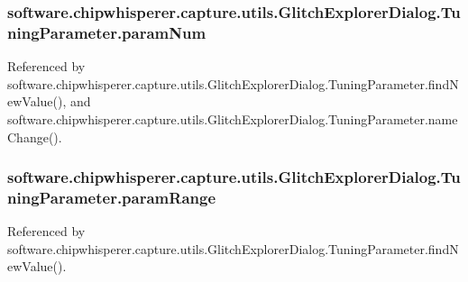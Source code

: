 \subsubsection[{param\+Num}]{\setlength{\rightskip}{0pt plus 5cm}software.\+chipwhisperer.\+capture.\+utils.\+Glitch\+Explorer\+Dialog.\+Tuning\+Parameter.\+param\+Num}\label{classsoftware_1_1chipwhisperer_1_1capture_1_1utils_1_1GlitchExplorerDialog_1_1TuningParameter_a29c3a9b9e51899e60e36e582db1cec06}


Referenced by software.\+chipwhisperer.\+capture.\+utils.\+Glitch\+Explorer\+Dialog.\+Tuning\+Parameter.\+find\+New\+Value(), and software.\+chipwhisperer.\+capture.\+utils.\+Glitch\+Explorer\+Dialog.\+Tuning\+Parameter.\+name\+Change().

\hypertarget{classsoftware_1_1chipwhisperer_1_1capture_1_1utils_1_1GlitchExplorerDialog_1_1TuningParameter_a1b6d2b9d82fe104bcb629514b512ddcf}{}
\subsubsection[{param\+Range}]{\setlength{\rightskip}{0pt plus 5cm}software.\+chipwhisperer.\+capture.\+utils.\+Glitch\+Explorer\+Dialog.\+Tuning\+Parameter.\+param\+Range}\label{classsoftware_1_1chipwhisperer_1_1capture_1_1utils_1_1GlitchExplorerDialog_1_1TuningParameter_a1b6d2b9d82fe104bcb629514b512ddcf}


Referenced by software.\+chipwhisperer.\+capture.\+utils.\+Glitch\+Explorer\+Dialog.\+Tuning\+Parameter.\+find\+New\+Value().

\hypertarget{classsoftware_1_1chipwhisperer_1_1capture_1_1utils_1_1GlitchExplorerDialog_1_1TuningParameter_a2cda1f9774aa60e6f9a821c4399775ff}{}
